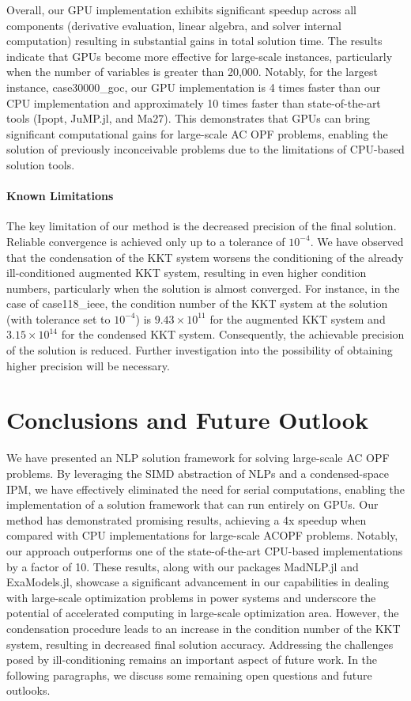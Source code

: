 \documentclass{IEEEtran4PSCC} %
\begin{document}
Overall, our GPU implementation exhibits significant speedup across
all components (derivative evaluation, linear algebra, and solver
internal computation) resulting in substantial gains in total solution
time. The results indicate that GPUs become more effective for
large-scale instances, particularly when the number of variables is
greater than 20,000. Notably, for the largest instance,
case30000\_goc, our GPU implementation is 4 times faster than our CPU
implementation and approximately 10 times faster than
state-of-the-art tools (Ipopt, JuMP.jl, and Ma27).
This demonstrates that GPUs can bring significant computational
gains for large-scale AC OPF problems, enabling the solution of
previously inconceivable problems due to the limitations of CPU-based
solution tools.

\paragraph*{Known Limitations}
The key limitation of our method is the decreased precision of the
final solution. Reliable convergence is achieved only up to a
tolerance of $10^{-4}$. We have observed that the condensation of the
KKT system worsens the conditioning of the already ill-conditioned
augmented KKT system, resulting in even higher condition numbers,
particularly when the solution is almost converged. For instance, in
the case of case118\_ieee, the condition number of the KKT system at
the solution (with tolerance set to $10^{-4}$) is $9.43\times 10^{11}$
for the augmented KKT system and $3.15\times 10^{14}$ for the
condensed KKT system. Consequently, the achievable precision of
the solution is reduced. Further investigation into the possibility of
obtaining higher precision will be necessary.

\section{Conclusions and Future Outlook}\label{sec:conc}
We have presented an NLP solution framework for solving large-scale AC
OPF problems. By leveraging the SIMD abstraction of NLPs and a
condensed-space IPM, we have effectively eliminated the need for
serial computations, enabling the implementation of a solution
framework that can run entirely on GPUs. Our method has demonstrated
promising results, achieving a 4x speedup when compared with CPU
implementations for large-scale ACOPF problems. Notably, our approach
outperforms one of the state-of-the-art CPU-based implementations by
a factor of 10. These results, along with our packages
MadNLP.jl and ExaModels.jl, showcase a significant advancement in our
capabilities in dealing with large-scale optimization problems in
power systems and underscore the potential of accelerated computing in
large-scale optimization area. However, the condensation procedure
leads to an increase in the condition number of the KKT system,
resulting in decreased final solution accuracy. Addressing the
challenges posed by ill-conditioning remains an important aspect
of future work. In the following paragraphs, we discuss some
remaining open questions and future outlooks.
\end{document}
